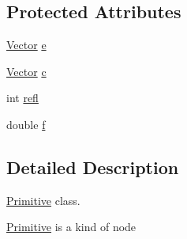 \subsection*{\-Protected \-Attributes}
\begin{DoxyCompactItemize}
\item 
\hyperlink{class_vector}{\-Vector} \hyperlink{class_primitive_aa60d41fbc09fbf11f6dd24b6e0252c5d}{e}
\item 
\hyperlink{class_vector}{\-Vector} \hyperlink{class_primitive_a3952aadb4a03a2e98e6ba5bdfbd0842f}{c}
\item 
int \hyperlink{class_primitive_a39a03ec4e90d63a30e1594b4d396fa77}{refl}
\item 
double \hyperlink{class_primitive_a6e6c2ea0ddfaaca10a3b18bb08af0706}{f}
\end{DoxyCompactItemize}


\subsection{\-Detailed \-Description}
\hyperlink{class_primitive}{\-Primitive} class. 

\hyperlink{class_primitive}{\-Primitive} is a kind of node 

